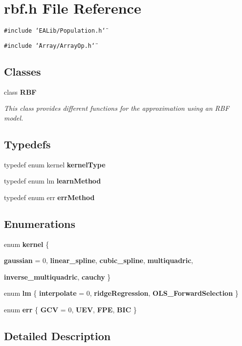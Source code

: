 \section{rbf.h File Reference}
\label{rbf_8h}
{\tt \#include \char`\"{}EALib/Population.h\char`\"{}}\par
{\tt \#include \char`\"{}Array/Array\-Op.h\char`\"{}}\par
\subsection*{Classes}
\begin{CompactItemize}
\item 
class {\bf RBF}
\begin{CompactList}\small\item\em This class provides different functions for the approximation using an RBF model. \item\end{CompactList}\end{CompactItemize}
\subsection*{Typedefs}
\begin{CompactItemize}
\item 
typedef enum kernel {\bf kernel\-Type}\label{rbf_8h_a0}

\item 
typedef enum lm {\bf learn\-Method}\label{rbf_8h_a1}

\item 
typedef enum err {\bf err\-Method}\label{rbf_8h_a2}

\end{CompactItemize}
\subsection*{Enumerations}
\begin{CompactItemize}
\item 
enum {\bf kernel} \{ \par
{\bf gaussian} =  0, 
{\bf linear\_\-spline}, 
{\bf cubic\_\-spline}, 
{\bf multiquadric}, 
\par
{\bf inverse\_\-multiquadric}, 
{\bf cauchy}
 \}
\item 
enum {\bf lm} \{ {\bf interpolate} =  0, 
{\bf ridge\-Regression}, 
{\bf OLS\_\-Forward\-Selection}
 \}
\item 
enum {\bf err} \{ {\bf GCV} =  0, 
{\bf UEV}, 
{\bf FPE}, 
{\bf BIC}
 \}
\end{CompactItemize}


\subsection{Detailed Description}
